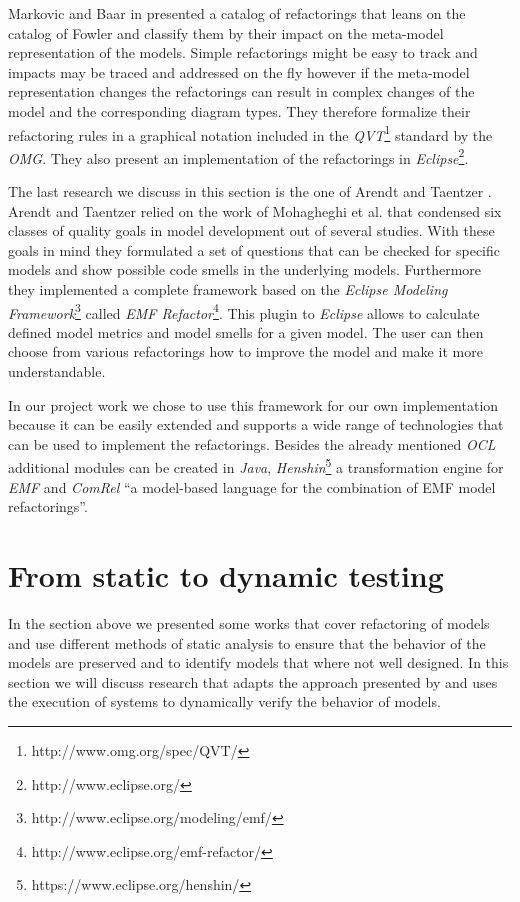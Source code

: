 \documentclass{llncs}
\begin{document}
Markovic and Baar in \cite{DBLP:journals/sosym/MarkovicB08} presented a catalog of refactorings that leans on the catalog of Fowler and classify them by their impact on the meta-model representation of the models. Simple refactorings might be easy to track and impacts may be traced and addressed on the fly however if the meta-model representation changes the refactorings can result in complex changes of the model and the corresponding diagram types. They therefore formalize their refactoring rules in a graphical notation included in the \textit{QVT}\footnote{http://www.omg.org/spec/QVT/} standard by the \textit{OMG}. They also present an implementation of the refactorings in \textit{Eclipse}\footnote{http://www.eclipse.org/}.

The last research we discuss in this section is the one of Arendt and Taentzer \cite{DBLP:conf/models/ArendtTW13}. Arendt and Taentzer relied on the work of Mohagheghi et al. \cite{DBLP:journals/infsof/MohagheghiDN09} that condensed six classes of quality goals in model development out of several studies. With these goals in mind they formulated a set of questions that can be checked for specific models and show possible code smells in the underlying models. Furthermore they implemented a complete framework based on the \textit{Eclipse Modeling Framework}\footnote{http://www.eclipse.org/modeling/emf/} called \textit{EMF Refactor}\footnote{http://www.eclipse.org/emf-refactor/}. This plugin to \textit{Eclipse} allows to calculate defined model metrics and model smells for a given model. The user can then choose from various refactorings how to improve the model and make it more understandable. 

In our project work we chose to use this framework for our own implementation because it can be easily extended and supports a wide range of technologies that can be used to implement the refactorings. Besides the already mentioned \textit{OCL} additional modules can be created in \textit{Java}, \textit{Henshin}\footnote{https://www.eclipse.org/henshin/} a transformation engine for \textit{EMF} and \textit{ComRel} ``a model-based language for the combination of EMF model refactorings''.

\section{From static to dynamic testing}
\label{sec:todynamics}

In the section above we presented some works that cover refactoring of models and use different methods of static analysis to ensure that the behavior of the models are preserved and to identify models that where not well designed. In this section we will discuss research that adapts the approach presented by \cite{rob99} and uses the execution of systems to dynamically verify the behavior of models.
\end{document}
